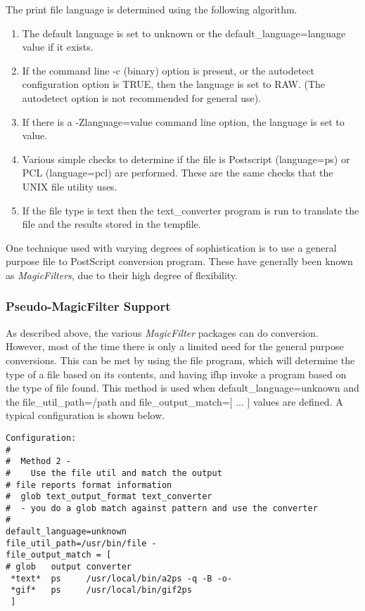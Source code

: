 \documentclass[a4paper]{article}
\begin{document}
The print file language is determined using the following algorithm.
\begin{enumerate}
\item The default language is set to
{\ttfamily unknown}
or the
{\ttfamily default\_language=language} value if it exists.
\item If the command line
{\ttfamily -c}
(binary) option is present,
or the
{\ttfamily autodetect} configuration option is TRUE,
then the language is set to
{\ttfamily RAW}.
(The autodetect option is not recommended for general use).
\item If there is a
{\ttfamily -Zlanguage=value} command line option,
the language is set to
{\ttfamily value}.
\item Various simple checks to determine if the file is
Postscript
(language={\ttfamily ps})
or PCL
(language={\ttfamily pcl})
are performed.
These are the same checks that the UNIX
{\ttfamily file}
utility uses.
\item If the file type is 
{\ttfamily text}
then the
{\ttfamily text\_converter}
program is run to translate the file and the results stored in
the {\ttfamily tempfile}.
\end{enumerate}


One technique used with varying degrees of sophistication is to
use a general purpose file to PostScript conversion program.
These have generally been known as
{\itshape MagicFilters\/}, due to their high degree of flexibility. 


\subsubsection{Pseudo-MagicFilter Support}

As described above,
the various
{\itshape MagicFilter\/} packages can do conversion.
However, most of the time there is only a limited need for the
general purpose conversions.
This can be met by using the
{\ttfamily file} program,  which will determine the type of a file based on
its contents,
and having {\ttfamily ifhp} invoke a program based on the type of file found.
This method is used when
{\ttfamily default\_language=unknown}
and the
{\ttfamily file\_util\_path=/path}
and
{\ttfamily file\_output\_match=[ ... ]}
values are defined.
A typical configuration is shown below.
\begin{tscreen}
\begin{verbatim}
Configuration:
# 
#  Method 2 -
#    Use the file util and match the output
# file reports format information
#  glob text_output_format text_converter
#  - you do a glob match against pattern and use the converter
#
default_language=unknown
file_util_path=/usr/bin/file -
file_output_match = [
# glob   output converter
 *text*  ps     /usr/local/bin/a2ps -q -B -o-
 *gif*   ps     /usr/local/bin/gif2ps
 ]
\end{verbatim}
\end{tscreen}
\end{document}
